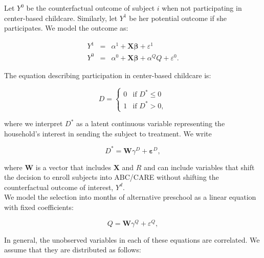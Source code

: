 \noindent Let $Y^{0}$ be the counterfactual outcome of subject $i$ when not participating in center-based childcare. Similarly, let $Y^{1}$ be her potential outcome if she participates. We model the outcome as:

\begin{eqnarray}
Y^1 &=& \alpha^1+\mathbf{X} \bm{\beta}                +\varepsilon^1 \nonumber  \\
Y^0 &=& \alpha^0+\mathbf{X} \bm{\beta} + \alpha^Q Q+\varepsilon^0.  \label{eq:potout}
\end{eqnarray}

\noindent The equation describing participation in center-based childcare is:

\begin{equation}
D = \left\{
        \begin{array}{ll}
        	0 &\text{if } D^* \leq  0 \\
            1 &\text{if } D^* > 0, \label{eq:sel1}
        \end{array}
    \right.
\end{equation}

\noindent where we interpret $D^*$ as a latent continuous variable representing the household's interest in sending the subject to treatment. We write

\begin{equation}
D^{*} = \mathbf{W} \gamma^{D} + \bm{\varepsilon}^{D}, \label{eq:probitD}
\end{equation}

\noindent where $\mathbf{W}$ is a vector that includes $\mathbf{X}$ and $R$ and can include variables that shift the decision to enroll subjects into ABC/CARE without shifting the counterfactual outcome of interest, $Y^{d}$. \\

\noindent We model the selection into months of alternative preschool as a linear equation with fixed coefficients:

\begin{equation}
Q = \mathbf{W} \gamma^{Q} + \varepsilon^{Q}, \label{eq:selq}
\end{equation}

\noindent In general, the unobserved variables in each of these equations are correlated. We assume that they are distributed as follows:

